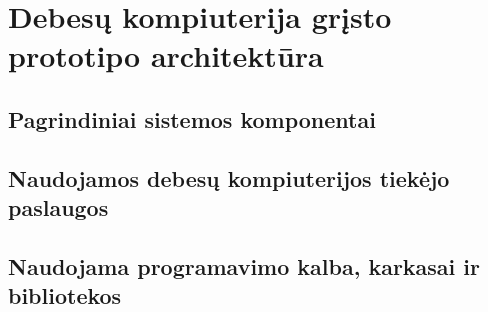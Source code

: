 \section{Debesų kompiuterija grįsto prototipo architektūra}
\subsection{Pagrindiniai sistemos komponentai}
\subsection{Naudojamos debesų kompiuterijos tiekėjo paslaugos}
\subsection{Naudojama programavimo kalba, karkasai ir bibliotekos}